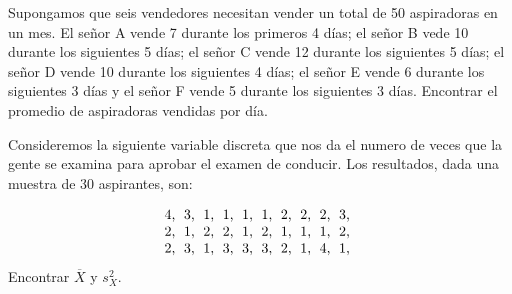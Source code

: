 \documentclass[12pt]{article}
\begin{document}
\begin{prob}Supongamos que seis vendedores necesitan vender un total
de 50 aspiradoras en un mes. El señor A vende 7 durante los primeros 4 días; el señor B
vede 10 durante los siguientes  5 días; el señor C vende 12 durante los siguientes 5
días; el señor D vende  10 durante los siguientes  4 días; el señor E vende 6 durante los
siguientes  3 días y el señor F vende 5 durante los siguientes  3 días. Encontrar el
promedio de aspiradoras vendidas por día.
\end{prob}

\begin{prob}Consideremos la siguiente variable discreta que nos da el
numero de veces que la gente se examina para  aprobar el examen de conducir. Los
resultados, dada  una muestra de 30 aspirantes, son:

$$
\vbox{\halign{\offinterlineskip\strut\hskip0.05cm #\hskip0.05cm& \hskip0.05cm
#\hskip0.05cm&\hskip0.05cm #\hskip0.05cm& \hskip0.05cm #\hskip0.05cm&\hskip0.05cm
#\hskip0.05cm& \hskip0.05cm #\hskip0.05cm&\hskip0.05cm #\hskip0.05cm& \hskip0.05cm
#\hskip0.05cm&\hskip0.05cm #\hskip0.05cm& \hskip0.05cm #\hskip0.05cm\cr 4, & 3, & 1, & 1,
& 1, & 1, & 2, & 2, & 2, & 3, \cr  2, & 1, & 2, & 2, & 1, & 2, & 1, & 1, & 1, & 2, \cr 2,
& 3, & 1, & 3, & 3, & 3, & 2, & 1, & 4, & 1, \cr}}
$$
Encontrar $\overline{X}$ y $s_X^2$.
\end{prob}
\end{document}
